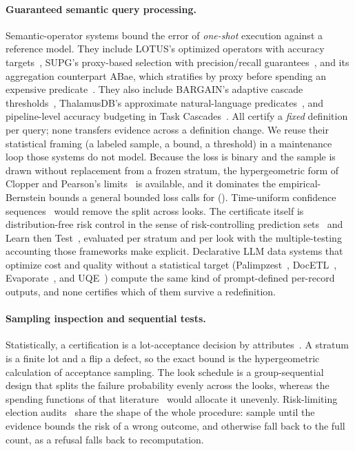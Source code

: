 \paragraph{Guaranteed semantic query processing.} Semantic-operator
systems bound the error of \emph{one-shot} execution against a
reference model. They include LOTUS's optimized operators with accuracy
targets~\cite{lotus}, SUPG's proxy-based selection with precision/recall
guarantees~\cite{supg}, and its aggregation counterpart ABae, which
stratifies by proxy before spending an expensive predicate~\cite{abae}.
They also include BARGAIN's adaptive cascade thresholds~\cite{bargain},
ThalamusDB's approximate natural-language predicates~\cite{thalamusdb},
and pipeline-level accuracy budgeting in Task
Cascades~\cite{taskcascades}. All certify a \emph{fixed} definition per
query; none transfers evidence across a definition change. We reuse
their statistical framing (a labeled sample, a bound, a threshold) in a
maintenance loop those systems do not model. Because the loss is binary
and the sample is drawn without replacement from a frozen stratum, the
hypergeometric form of Clopper and Pearson's limits~\cite{clopper} is
available, and it dominates the empirical-Bernstein bounds a general
bounded loss calls for (). Time-uniform
confidence sequences~\cite{howard,wsr} would remove the split across
looks. The certificate itself is distribution-free risk control in the
sense of risk-controlling prediction sets~\cite{rcps} and Learn then
Test~\cite{ltt}, evaluated per stratum and per look with the
multiple-testing accounting those frameworks make explicit. Declarative
LLM data systems that optimize cost and quality without a statistical
target (Palimpzest~\cite{palimpzest}, DocETL~\cite{docetl},
Evaporate~\cite{evaporate}, and UQE~\cite{uqe}) compute the same kind of
prompt-defined per-record outputs, and none certifies which of them
survive a redefinition.

\keeprunin
\paragraph{Sampling inspection and sequential tests.} Statistically, a
certification is a lot-acceptance decision by
attributes~\cite{dodgeromig}. A stratum is a finite lot and a flip a
defect, so the exact bound is the hypergeometric calculation of
acceptance sampling. The look
schedule is a group-sequential design that splits the failure
probability evenly across the looks, whereas the spending functions of
that literature~\cite{pocock,landemets} would allocate it unevenly.
Risk-limiting election audits~\cite{rla} share the shape of the whole
procedure: sample until the evidence bounds the risk of a wrong outcome,
and otherwise fall back to the full count, as a refusal falls back to
recomputation.

